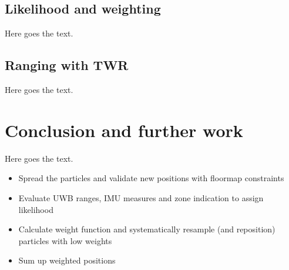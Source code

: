 \subsection{Likelihood and weighting}
Here goes the text.


\subsection{Ranging with TWR}
Here goes the text.




\section{Conclusion and further work}
Here goes the text.
\begin{itemize}
\item Spread the particles and validate new positions with floormap constraints
\item Evaluate UWB ranges, IMU measures and zone indication to assign likelihood
\item Calculate weight function and systematically resample (and reposition) particles with low weights
\item Sum up weighted positions
\end{itemize}
